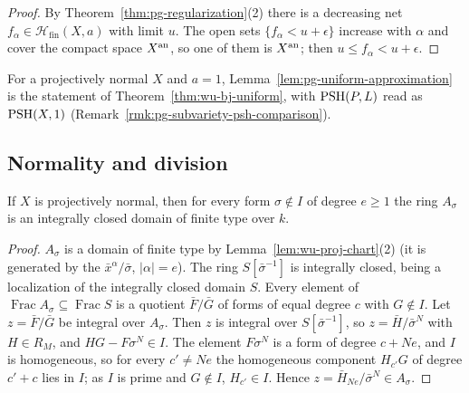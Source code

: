 \begin{proof}
By Theorem~\ref{thm:pg-regularization}(2) there is a decreasing net $f_\alpha\in\mathcal H_{\mathrm{fin}}(X,a)$ with limit $u$. The open sets
$\{f_\alpha<u+\epsilon\}$ increase with $\alpha$ and cover the compact space $X^{\mathrm{an}}$, so one of them is $X^{\mathrm{an}}$; then
$u\le f_\alpha<u+\epsilon$.
\end{proof}

\begin{remark}\label{rmk:pg-uniform-approximation}
For a projectively normal $X$ and $a=1$, Lemma~\ref{lem:pg-uniform-approximation} is the statement of
Theorem~\ref{thm:wu-bj-uniform}, with $\operatorname{PSH}(P,L)$ read as $\operatorname{PSH}(X,1)$ (Remark~\ref{rmk:pg-subvariety-psh-comparison}).
\end{remark}

\subsection{Normality and division}\label{subsec:pg-normal}

\begin{lemma}\label{lem:pg-chart-normal}
\leanok
{}
If $X$ is projectively normal, then for every form $\sigma\notin I$ of degree $e\ge1$ the ring $A_\sigma$ is an integrally closed domain
of finite type over $k$.
\end{lemma}

\begin{proof}
$A_\sigma$ is a domain of finite type by Lemma~\ref{lem:wu-proj-chart}(2) (it is generated by the $\bar x^\alpha/\bar\sigma$, $|\alpha|=e$). The
ring $S[\bar\sigma^{-1}]$ is integrally closed, being a localization of the integrally closed domain $S$. Every element of
$\operatorname{Frac}A_\sigma\subseteq\operatorname{Frac}S$ is a quotient $\bar F/\bar G$ of forms of equal degree $c$ with $G\notin I$. Let
$z=\bar F/\bar G$ be integral over $A_\sigma$. Then $z$ is integral over $S[\bar\sigma^{-1}]$, so $z=\bar H/\bar\sigma^N$ with $H\in R_M$,
and $HG-F\sigma^N\in I$. The element $F\sigma^N$ is a form of degree $c+Ne$, and $I$ is homogeneous, so for every $c'\ne Ne$ the
homogeneous component $H_{c'}G$ of degree $c'+c$ lies in $I$; as $I$ is prime and $G\notin I$, $H_{c'}\in I$. Hence
$z=\bar H_{Ne}/\bar\sigma^N\in A_\sigma$.
\end{proof}

